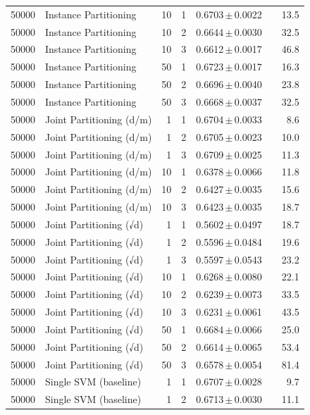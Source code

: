 \begin{table}[ht]
\begin{tabular}{rlrrccr}
50000 & Instance Partitioning & 10 & 1 & 0.6703\,$\pm$\,0.0022 &  & 13.5 \\
50000 & Instance Partitioning & 10 & 2 & 0.6644\,$\pm$\,0.0030 &  & 32.5 \\
50000 & Instance Partitioning & 10 & 3 & 0.6612\,$\pm$\,0.0017 &  & 46.8 \\
50000 & Instance Partitioning & 50 & 1 & 0.6723\,$\pm$\,0.0017 &  & 16.3 \\
50000 & Instance Partitioning & 50 & 2 & 0.6696\,$\pm$\,0.0040 &  & 23.8 \\
50000 & Instance Partitioning & 50 & 3 & 0.6668\,$\pm$\,0.0037 &  & 32.5 \\
50000 & Joint Partitioning (d/m) & 1 & 1 & 0.6704\,$\pm$\,0.0033 &  & 8.6 \\
50000 & Joint Partitioning (d/m) & 1 & 2 & 0.6705\,$\pm$\,0.0023 &  & 10.0 \\
50000 & Joint Partitioning (d/m) & 1 & 3 & 0.6709\,$\pm$\,0.0025 &  & 11.3 \\
50000 & Joint Partitioning (d/m) & 10 & 1 & 0.6378\,$\pm$\,0.0066 &  & 11.8 \\
50000 & Joint Partitioning (d/m) & 10 & 2 & 0.6427\,$\pm$\,0.0035 &  & 15.6 \\
50000 & Joint Partitioning (d/m) & 10 & 3 & 0.6423\,$\pm$\,0.0035 &  & 18.7 \\
50000 & Joint Partitioning (√d) & 1 & 1 & 0.5602\,$\pm$\,0.0497 &  & 18.7 \\
50000 & Joint Partitioning (√d) & 1 & 2 & 0.5596\,$\pm$\,0.0484 &  & 19.6 \\
50000 & Joint Partitioning (√d) & 1 & 3 & 0.5597\,$\pm$\,0.0543 &  & 23.2 \\
50000 & Joint Partitioning (√d) & 10 & 1 & 0.6268\,$\pm$\,0.0080 &  & 22.1 \\
50000 & Joint Partitioning (√d) & 10 & 2 & 0.6239\,$\pm$\,0.0073 &  & 33.5 \\
50000 & Joint Partitioning (√d) & 10 & 3 & 0.6231\,$\pm$\,0.0061 &  & 43.5 \\
50000 & Joint Partitioning (√d) & 50 & 1 & 0.6684\,$\pm$\,0.0066 &  & 25.0 \\
50000 & Joint Partitioning (√d) & 50 & 2 & 0.6614\,$\pm$\,0.0065 &  & 53.4 \\
50000 & Joint Partitioning (√d) & 50 & 3 & 0.6578\,$\pm$\,0.0054 &  & 81.4 \\
50000 & Single SVM (baseline) & 1 & 1 & 0.6707\,$\pm$\,0.0028 &  & 9.7 \\
50000 & Single SVM (baseline) & 1 & 2 & 0.6713\,$\pm$\,0.0030 &  & 11.1 \\

\end{tabular}
\end{table}
